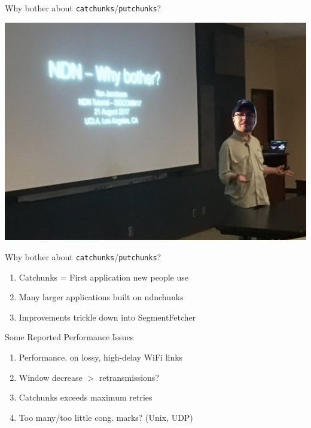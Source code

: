 
\begin{frame}{Why bother about \texttt{catchunks}/\texttt{putchunks}?}

\includegraphics[width=\linewidth]{images/why_bother2.png}

\end{frame}


\begin{frame}{Why bother about \texttt{catchunks}/\texttt{putchunks}?}


\begin{enumerate}
\item Catchunks = First application new people use
\pause
\item Many larger applications built on ndnchunks
\pause
\item Improvements trickle down into SegmentFetcher
\end{enumerate}

\end{frame}


\begin{frame}{Some Reported Performance Issues}

\begin{enumerate}
\item Performance. on lossy, high-delay WiFi links


\pause
\item Window decrease $>$ retransmissions? 

\pause
\item Catchunks exceeds maximum retries

\pause
\item Too many/too little cong. marks? (Unix, UDP)
\end{enumerate}

\end{frame}



